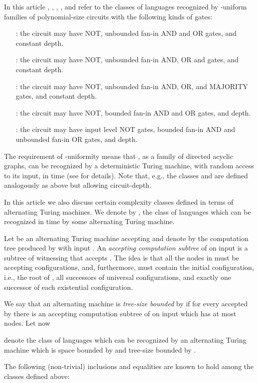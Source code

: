 \documentclass{LMCS}
\begin{document}
In this article  , ,  , , and   refer to the classes of languages recognized by -uniform families  of  polynomial-size circuits with the following kinds of gates: 
\begin{enumerate}[]
\item[:] the circuit  may have NOT, unbounded fan-in AND and OR gates, and constant depth.
\item[:]  the circuit  may have NOT, unbounded fan-in AND, OR and   gates, and constant depth.
\item[:] the circuit  may have NOT, unbounded fan-in AND, OR, and MAJORITY gates, and constant depth.
\item[:]  the circuit  may have NOT,  bounded fan-in AND and OR gates, and  depth.
\item[:]  the circuit  may have input level NOT gates,  bounded fan-in AND and unbounded fan-in OR gates, and  depth.
\end{enumerate}
 The requirement of -uniformity means that , as a family of  directed acyclic graphs, can be recognized by a deterministic Turing machine, with random access to its input,  in time  (see \cite{vol99} for details). Note that, e.g., the classes  and  are defined analogously as above but allowing  circuit-depth. 

In this article we also discuss certain complexity classes defined in terms of alternating Turing machines.  We denote by , the class of languages which can be recognized in time   by some  alternating Turing machine.  

Let  be an alternating Turing machine accepting  and denote by  the computation tree  produced by  with input . An \emph{accepting computation subtree}  of  on input  is a subtree of   witnessing that  accepts . The idea is that all the nodes in  must be accepting configurations, and, furthermore,  must contain the initial configuration, i.e., the  root of , all successors of universal configurations, and exactly one successor of each existential configuration.  

We say that an alternating machine  is \emph{tree-size bounded} by  if for every  accepted by  there is an accepting computation subtree of  on input  which has at most  nodes. 
Let now 
 
 denote the class of languages which can be recognized by an  alternating Turing machine  which is  space bounded by  and tree-size bounded by . 

The following (non-trivial)  inclusions and  equalities are known to hold among the classes defined above: 
\end{document}
